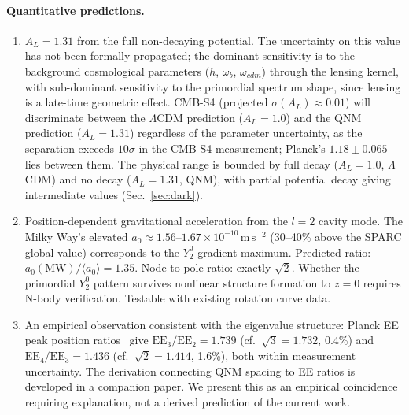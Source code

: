\documentclass[aps,prd,twocolumn,superscriptaddress,showpacs,preprintnumbers,amsmath,amssymb,nofootinbib]{revtex4-2}
\newcommand{\lcdm}{$\Lambda$CDM}
\begin{document}
\paragraph{Quantitative predictions.}
\begin{enumerate}
\item[(i)] $A_L = 1.31$ from the full non-decaying potential. The uncertainty on this value has not been formally propagated; the dominant sensitivity is to the background cosmological parameters ($h$, $\omega_b$, $\omega_{cdm}$) through the lensing kernel, with sub-dominant sensitivity to the primordial spectrum shape, since lensing is a late-time geometric effect. CMB-S4 (projected $\sigma(A_L) \approx 0.01$) will discriminate between the \lcdm{} prediction ($A_L = 1.0$) and the QNM prediction ($A_L = 1.31$) regardless of the parameter uncertainty, as the separation exceeds $10\sigma$ in the CMB-S4 measurement; Planck's $1.18 \pm 0.065$ lies between them. The physical range is bounded by full decay ($A_L = 1.0$, \lcdm) and no decay ($A_L = 1.31$, QNM), with partial potential decay giving intermediate values (Sec.~\ref{sec:dark}).

\item[(ii)] Position-dependent gravitational acceleration from the $l = 2$ cavity mode. The Milky Way's elevated $a_0 \approx 1.56$--$1.67 \times 10^{-10}\,\mathrm{m\,s^{-2}}$ (30--40\% above the SPARC global value) corresponds to the $Y_2^0$ gradient maximum. Predicted ratio: $a_0(\mathrm{MW})/\langle a_0 \rangle = 1.35$. Node-to-pole ratio: exactly $\sqrt{2}$. Whether the primordial $Y_2^0$ pattern survives nonlinear structure formation to $z = 0$ requires N-body verification. Testable with existing rotation curve data.

\item[(iii)] An empirical observation consistent with the eigenvalue structure: Planck EE peak position ratios~\cite{Pan2016} give $\mathrm{EE}_3/\mathrm{EE}_2 = 1.739$ (cf.\ $\sqrt{3} = 1.732$, 0.4\%) and $\mathrm{EE}_4/\mathrm{EE}_3 = 1.436$ (cf.\ $\sqrt{2} = 1.414$, 1.6\%), both within measurement uncertainty. The derivation connecting QNM spacing to EE ratios is developed in a companion paper. We present this as an empirical coincidence requiring explanation, not a derived prediction of the current work.
\end{enumerate}
\end{document}
